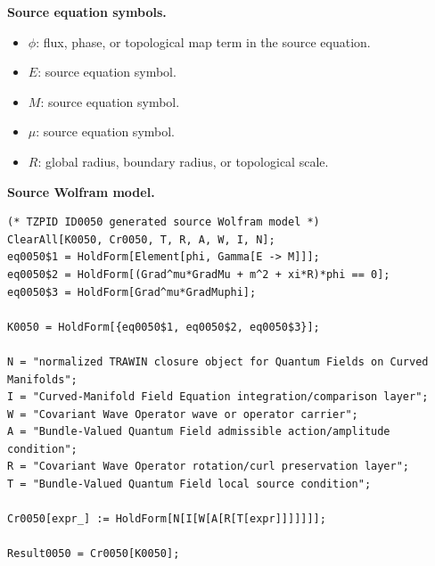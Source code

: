 \begin{minipage}[t]{0.49\linewidth}
\begingroup
\small
\raggedright
\textbf{Source equation symbols.}\par
\begin{itemize}[leftmargin=1.35em,itemsep=1pt,topsep=1pt,parsep=0pt]
    \item $\phi$: flux, phase, or topological map term in the source equation.
    \item $E$: source equation symbol.
    \item $M$: source equation symbol.
    \item $\mu$: source equation symbol.
    \item $R$: global radius, boundary radius, or topological scale.
\end{itemize}
\endgroup
\end{minipage}\hfill
\begin{minipage}[t]{0.47\linewidth}
\begingroup
\scriptsize
\raggedright
\textbf{Source Wolfram model.}\par
\begin{Verbatim}[fontsize=\tiny,breaklines=true,breakanywhere=true]
(* TZPID ID0050 generated source Wolfram model *)
ClearAll[K0050, Cr0050, T, R, A, W, I, N];
eq0050$1 = HoldForm[Element[phi, Gamma[E -> M]]];
eq0050$2 = HoldForm[(Grad^mu*GradMu + m^2 + xi*R)*phi == 0];
eq0050$3 = HoldForm[Grad^mu*GradMuphi];

K0050 = HoldForm[{eq0050$1, eq0050$2, eq0050$3}];

N = "normalized TRAWIN closure object for Quantum Fields on Curved Manifolds";
I = "Curved-Manifold Field Equation integration/comparison layer";
W = "Covariant Wave Operator wave or operator carrier";
A = "Bundle-Valued Quantum Field admissible action/amplitude condition";
R = "Covariant Wave Operator rotation/curl preservation layer";
T = "Bundle-Valued Quantum Field local source condition";

Cr0050[expr_] := HoldForm[N[I[W[A[R[T[expr]]]]]]];

Result0050 = Cr0050[K0050];
\end{Verbatim}
\endgroup
\end{minipage}

